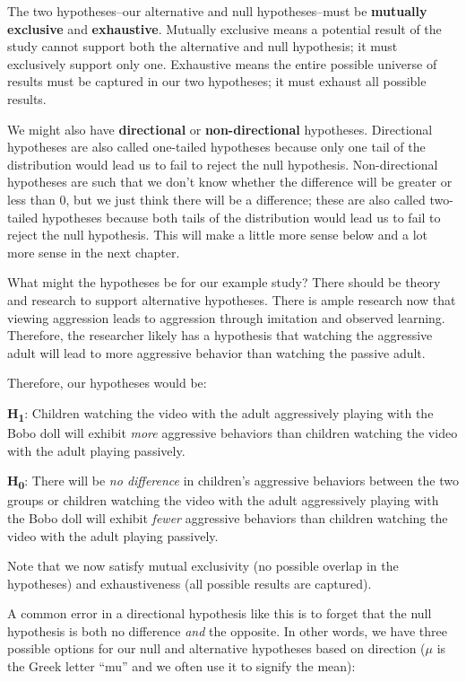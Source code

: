 \documentclass[
]{book}
\begin{document}
The two hypotheses--our alternative and null hypotheses--must be \textbf{mutually exclusive} and \textbf{exhaustive}. Mutually exclusive means a potential result of the study cannot support both the alternative and null hypothesis; it must exclusively support only one. Exhaustive means the entire possible universe of results must be captured in our two hypotheses; it must exhaust all possible results.

We might also have \textbf{directional} or \textbf{non-directional} hypotheses. Directional hypotheses are also called one-tailed hypotheses because only one tail of the distribution would lead us to fail to reject the null hypothesis. Non-directional hypotheses are such that we don't know whether the difference will be greater or less than 0, but we just think there will be a difference; these are also called two-tailed hypotheses because both tails of the distribution would lead us to fail to reject the null hypothesis. This will make a little more sense below and a lot more sense in the next chapter.

What might the hypotheses be for our example study? There should be theory and research to support alternative hypotheses. There is ample research now that viewing aggression leads to aggression through imitation and observed learning. Therefore, the researcher likely has a hypothesis that watching the aggressive adult will lead to more aggressive behavior than watching the passive adult.

Therefore, our hypotheses would be:

\textbf{H\textsubscript{1}}: Children watching the video with the adult aggressively playing with the Bobo doll will exhibit \emph{more} aggressive behaviors than children watching the video with the adult playing passively.

\textbf{H\textsubscript{0}}: There will be \emph{no difference} in children's aggressive behaviors between the two groups or children watching the video with the adult aggressively playing with the Bobo doll will exhibit \emph{fewer} aggressive behaviors than children watching the video with the adult playing passively.

Note that we now satisfy mutual exclusivity (no possible overlap in the hypotheses) and exhaustiveness (all possible results are captured).

A common error in a directional hypothesis like this is to forget that the null hypothesis is both no difference \emph{and} the opposite. In other words, we have three possible options for our null and alternative hypotheses based on direction (\(\mu\) is the Greek letter ``mu'' and we often use it to signify the mean):
\end{document}
